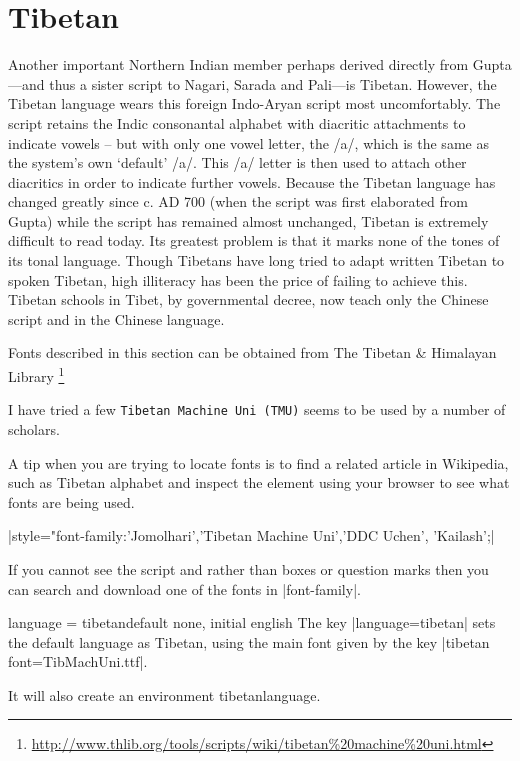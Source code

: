 \section{Tibetan}
\label{tibetan}


Another important Northern Indian member perhaps
derived directly from Gupta---and thus a sister script to Nagari,
Sarada and Pali---is Tibetan. However, the Tibetan
language wears this foreign Indo-Aryan script most uncomfortably.\cite{writing}
The script retains the Indic consonantal alphabet with diacritic
attachments to indicate vowels – but with only one vowel
letter, the /a/, which is the same as the system’s own ‘default’ /a/.
This /a/ letter is then used to attach other diacritics in order to
indicate further vowels. Because the Tibetan language has
changed greatly since c. AD 700 (when the script was first elaborated
from Gupta) while the script has remained almost
unchanged, Tibetan is extremely difficult to read today. Its
greatest problem is that it marks none of the tones of its tonal
language. Though Tibetans have long tried to adapt written
Tibetan to spoken Tibetan, high illiteracy has been the price of
failing to achieve this. Tibetan schools in Tibet, by governmental
decree, now teach only the Chinese script and in the Chinese
language.

\newfontfamily{}

\newfontfamily{}


Fonts described in this section can be obtained from The Tibetan \& Himalayan Library
\footnote{\url{http://www.thlib.org/tools/scripts/wiki/tibetan\%20machine\%20uni.html}  }

I have tried a few \texttt{Tibetan Machine Uni (TMU)} seems to be used by a number of scholars. 

A tip when you are trying to locate fonts is to find a related article in Wikipedia, such as Tibetan alphabet and inspect the element using your browser to see what fonts are being used.


|style="font-family:'Jomolhari','Tibetan Machine Uni','DDC Uchen', 'Kailash';| 


If you cannot see the script and rather than boxes or question marks then you can search and download one of the fonts in |font-family|.



\begin{docKey}[phd]{language}{ = tibetan}{default none, initial english} 
The key |language=tibetan| sets the default language as Tibetan, using the main font given by the key |tibetan font=TibMachUni.ttf|.

It will also create an environment tibetanlanguage.
\end{docKey}

